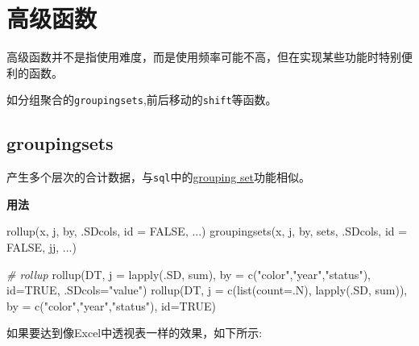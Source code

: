 \documentclass[
]{book}
\newenvironment{Shaded}{\begin{snugshade}}{\end{snugshade}}
\newcommand{\AttributeTok}[1]{\textcolor[rgb]{0.77,0.63,0.00}{#1}}
\newcommand{\CommentTok}[1]{\textcolor[rgb]{0.56,0.35,0.01}{\textit{#1}}}
\newcommand{\ConstantTok}[1]{\textcolor[rgb]{0.00,0.00,0.00}{#1}}
\newcommand{\FunctionTok}[1]{\textcolor[rgb]{0.00,0.00,0.00}{#1}}
\newcommand{\NormalTok}[1]{#1}
\newcommand{\StringTok}[1]{\textcolor[rgb]{0.31,0.60,0.02}{#1}}
\begin{document}
\hypertarget{ux9ad8ux7ea7ux51fdux6570}{%
\section{高级函数}\label{ux9ad8ux7ea7ux51fdux6570}}

高级函数并不是指使用难度，而是使用频率可能不高，但在实现某些功能时特别便利的函数。

如分组聚合的\texttt{groupingsets},前后移动的\texttt{shift}等函数。

\hypertarget{groupingsets}{%
\subsection{groupingsets}\label{groupingsets}}

产生多个层次的合计数据，与\texttt{sql}中的\href{https://www.postgresql.org/docs/9.5/queries-table-expressions.html\#QUERIES-GROUPING-SETS}{grouping set}功能相似。

\textbf{用法}

\begin{Shaded}
\begin{Highlighting}[]
\FunctionTok{rollup}\NormalTok{(x, j, by, .SDcols, }\AttributeTok{id =} \ConstantTok{FALSE}\NormalTok{, ...)}
\FunctionTok{groupingsets}\NormalTok{(x, j, by, sets, .SDcols, }\AttributeTok{id =} \ConstantTok{FALSE}\NormalTok{, jj, ...)}

\CommentTok{\# rollup}
\FunctionTok{rollup}\NormalTok{(DT, }\AttributeTok{j =} \FunctionTok{lapply}\NormalTok{(.SD, sum), }\AttributeTok{by =} \FunctionTok{c}\NormalTok{(}\StringTok{"color"}\NormalTok{,}\StringTok{"year"}\NormalTok{,}\StringTok{"status"}\NormalTok{), }\AttributeTok{id=}\ConstantTok{TRUE}\NormalTok{, }\AttributeTok{.SDcols=}\StringTok{"value"}\NormalTok{)}
\FunctionTok{rollup}\NormalTok{(DT, }\AttributeTok{j =} \FunctionTok{c}\NormalTok{(}\FunctionTok{list}\NormalTok{(}\AttributeTok{count=}\NormalTok{.N), }\FunctionTok{lapply}\NormalTok{(.SD, sum)), }\AttributeTok{by =} \FunctionTok{c}\NormalTok{(}\StringTok{"color"}\NormalTok{,}\StringTok{"year"}\NormalTok{,}\StringTok{"status"}\NormalTok{), }\AttributeTok{id=}\ConstantTok{TRUE}\NormalTok{)}
\end{Highlighting}
\end{Shaded}

如果要达到像Excel中透视表一样的效果，如下所示:
\end{document}
